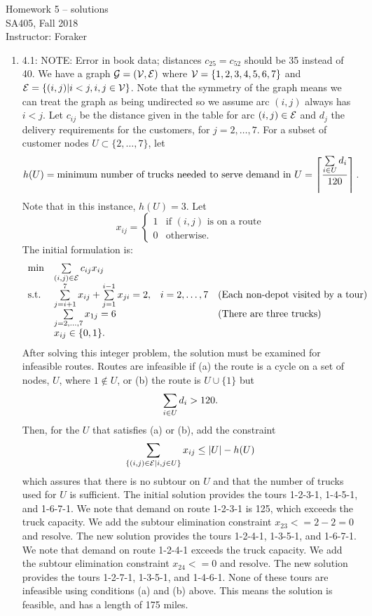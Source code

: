 \documentclass[10pt]{article}
\newcommand{\binvar}[1]{\left\{
    \begin{array}{ll}
      1 & \mbox{#1} \\
      0 & \mbox{otherwise.}
    \end{array}
    \right.}
\begin{document}
\begin{center}
  {\sc Homework 5 -- solutions}\\
  {\sc SA405, Fall 2018} \\
  {\sc Instructor: Foraker}
\end{center}

\medskip

\begin{enumerate} 
\item 4.1: NOTE:  Error in book data; distances $c_{25}=c_{52}$ should be 35 instead of 40.  We have a graph ${\cal G} = ({\cal V},{\cal E})$ where ${\cal V} =  \{1,2,3,4,5,6,7\}$ and ${\cal E} = \{(i,j) | i < j, i, j \in {\cal V}\}$. Note
  that the symmetry of the graph means we can treat the graph as being
  undirected so we assume arc $(i,j)$ always has $i < j$.
  Let $c_{ij}$ be the distance given in the table for arc $(i,j) \in {\cal E}$ and $d_j$ the
  delivery requirements for the customers, for $j = 2,\ldots, 7$.
  For a subset of customer nodes $U \subset \{2,\ldots,7\}$, let
  \[
  h(U) = \mbox{minimum number of trucks needed to serve demand in $U$}
  = \left\lceil \frac{\sum\limits_{i \in U} d_i}{120} \right\rceil.
  \]
  Note that in this instance, $h(U) = 3$.  Let
  \[
  x_{ij} = \binvar{if $(i,j)$ is on a route}
  \]
  The initial formulation is:
  \[
  \begin{array}{llll}
    \min & \sum\limits_{(i,j) \in {\cal E}} c_{ij} x_{ij} & & \\
    \mbox{s.t.} & \sum\limits_{j=i+1}^7 x_{ij} + \sum\limits_{j=1}^{i-1} x_{ji} = 2, &
    i = 2,\ldots,7 & \mbox{(Each non-depot visited by a tour)} \\
    & \sum\limits_{j=2,\ldots,7} x_{1j} = 6 & & \mbox{(There are three trucks)}
    \\
    & x_{ij} \in \{0,1\}. & & 
  \end{array}
  \]
  After solving this integer problem, the solution must be examined
  for infeasible routes. Routes are infeasible if (a) the route is a
  cycle on a set of nodes, $U$, where $1 \not\in U$, or (b) the route
  is $U \cup \{1\}$ but 
  \[
  \sum\limits_{i \in U} d_i > 120.
  \]
  Then, for the $U$ that satisfies (a) or (b), add the constraint
  \[
  \sum\limits_{\{(i,j) \in {\cal E}| i,j \in U\}} x_{ij} \leq |U| - h(U) 
  \]
  which assures that there is no subtour on $U$ and that the number of
  trucks used for $U$ is sufficient.  The initial solution provides the tours 1-2-3-1, 1-4-5-1, and 1-6-7-1.  We note that demand on route 1-2-3-1 is 125, which exceeds the truck capacity.  We add the subtour elimination constraint $x_{23} <= 2 - 2 = 0$ and resolve.  The new solution provides the tours 1-2-4-1, 1-3-5-1, and 1-6-7-1.  We note that demand on route 1-2-4-1 exceeds the truck capacity.  We add the subtour elimination constraint $x_{24} <= 0$ and resolve.  The new solution provides the tours 1-2-7-1, 1-3-5-1, and 1-4-6-1.  None of these tours are infeasible using conditions (a) and (b) above.  This means the solution is feasible, and has a length of 175 miles.


\end{enumerate}
\end{document}
